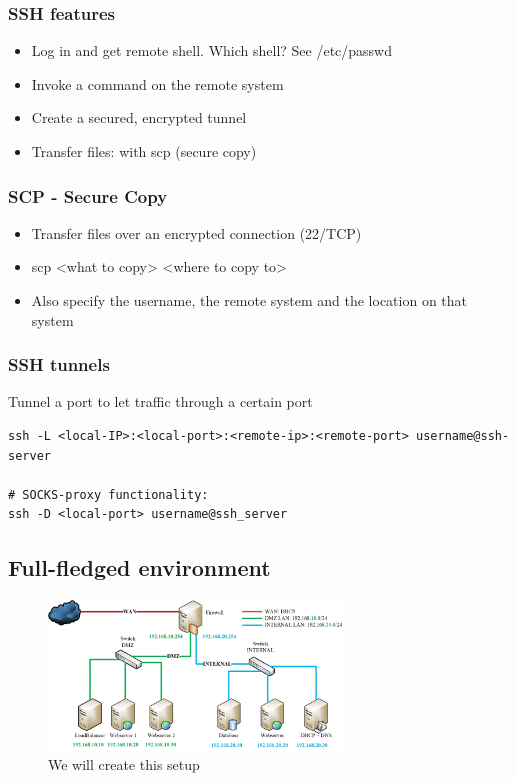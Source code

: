 \documentclass{article}
\begin{document}
\subsubsection{SSH features}

\begin{itemize}
    \item Log in and get remote shell. Which shell? See /etc/passwd
    \item Invoke a command on the remote system
    \item Create a secured, encrypted tunnel
    \item Transfer files: with scp (secure copy)
\end{itemize}

\subsubsection{SCP - Secure Copy}

\begin{itemize}
    \item Transfer files over an encrypted connection (22/TCP)
    \item scp <what to copy> <where to copy to>
    \item Also specify the username, the remote system and the location on that system
\end{itemize}

\subsubsection{SSH tunnels}

Tunnel a port to let traffic through a certain port

\begin{verbatim}
ssh -L <local-IP>:<local-port>:<remote-ip>:<remote-port> username@ssh-server

# SOCKS-proxy functionality:
ssh -D <local-port> username@ssh_server
\end{verbatim}

\subsection{Full-fledged environment}

\begin{figure}[H]
    \centering
    \includegraphics[width=0.7\textwidth]{full-fledged-environment.jpg}
    \caption{We will create this setup}
\end{figure}
\end{document}
